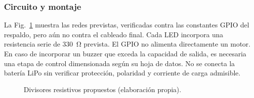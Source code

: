 \documentclass[11pt,letterpaper]{article}
\begin{document}
\subsubsection{Circuito y montaje}
La Fig.~\ref{fig:circuit} muestra las redes previstas, verificadas contra las constantes GPIO del respaldo, pero aún no contra el cableado final. Cada LED incorpora una resistencia serie de \SI{330}{\ohm} prevista. El GPIO no alimenta directamente un motor. En caso de incorporar un buzzer que exceda la capacidad de salida, es necesaria una etapa de control dimensionada según su hoja de datos. No se conecta la batería LiPo sin verificar protección, polaridad y corriente de carga admisible.
\begin{figure}[htbp]\centering
{}
\caption{Divisores resistivos propuestos (elaboración propia).}\label{fig:circuit}
\end{figure}
\end{document}
